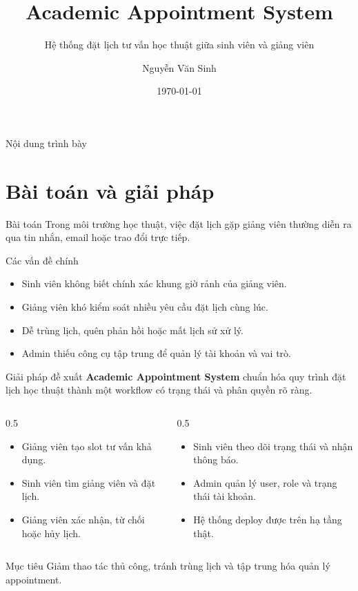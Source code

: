 \documentclass[aspectratio=169,11pt]{beamer}
\title[Academic Appointment]{Academic Appointment System}
\subtitle{Hệ thống đặt lịch tư vấn học thuật giữa sinh viên và giảng viên}
\author{Nguyễn Văn Sinh}
\institute{MSSV: 2331200098 \quad Lớp: CNTT-K65}
\date{\today}
\begin{document}
\begin{frame}
  \titlepage
\end{frame}

\begin{frame}{Nội dung trình bày}
  \tableofcontents
\end{frame}

\section{Bài toán và giải pháp}

\begin{frame}{Bài toán}
  Trong môi trường học thuật, việc đặt lịch gặp giảng viên thường diễn ra qua tin nhắn, email hoặc trao đổi trực tiếp.

  \begin{block}{Các vấn đề chính}
    \begin{itemize}
      \item Sinh viên không biết chính xác khung giờ rảnh của giảng viên.
      \item Giảng viên khó kiểm soát nhiều yêu cầu đặt lịch cùng lúc.
      \item Dễ trùng lịch, quên phản hồi hoặc mất lịch sử xử lý.
      \item Admin thiếu công cụ tập trung để quản lý tài khoản và vai trò.
    \end{itemize}
  \end{block}
\end{frame}

\begin{frame}{Giải pháp đề xuất}
  \textbf{Academic Appointment System} chuẩn hóa quy trình đặt lịch học thuật thành một workflow có trạng thái và phân quyền rõ ràng.

  \begin{columns}[T]
    \begin{column}{0.5\textwidth}
      \begin{itemize}
        \item Giảng viên tạo slot tư vấn khả dụng.
        \item Sinh viên tìm giảng viên và đặt lịch.
        \item Giảng viên xác nhận, từ chối hoặc hủy lịch.
      \end{itemize}
    \end{column}
    \begin{column}{0.5\textwidth}
      \begin{itemize}
        \item Sinh viên theo dõi trạng thái và nhận thông báo.
        \item Admin quản lý user, role và trạng thái tài khoản.
        \item Hệ thống deploy được trên hạ tầng thật.
      \end{itemize}
    \end{column}
  \end{columns}

  \begin{alertblock}{Mục tiêu}
    Giảm thao tác thủ công, tránh trùng lịch và tập trung hóa quản lý appointment.
  \end{alertblock}
\end{frame}
\end{document}

